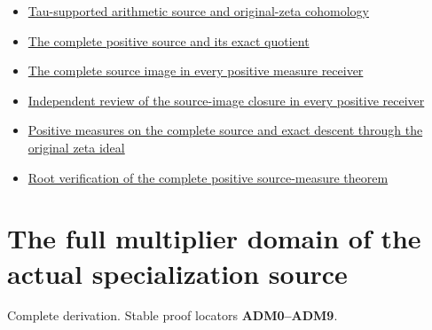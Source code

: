 \begin{itemize}
{  monodromy, complete clock observations, and the original zeta weights}
\item
  \href{https://github.com/KokunoYumeto/zeta-function-research-reader/blob/main/workbenches/splitzero-tandem/continuations/20260925-full-source-tensor-and-original-divisor/identity/README.md}{Tau-supported
  arithmetic source and original-zeta cohomology}
\item
  \href{https://github.com/KokunoYumeto/zeta-function-research-reader/blob/main/workbenches/splitzero-tandem/continuations/20260925-full-source-tensor-and-original-divisor/identity/SOURCE_MEASURE_ADDITION.md}{The
  complete positive source and its exact quotient}
\item
  \href{https://github.com/KokunoYumeto/zeta-function-research-reader/blob/main/workbenches/splitzero-tandem/continuations/20260925-full-source-tensor-and-original-divisor/identity/SOURCE_MEASURE_CLOSURE_AND_ORIGINAL_QUOTIENT.md}{The
  complete source image in every positive measure receiver}
\item
  \href{https://github.com/KokunoYumeto/zeta-function-research-reader/blob/main/workbenches/splitzero-tandem/continuations/20260925-full-source-tensor-and-original-divisor/identity/SOURCE_MEASURE_CLOSURE_INDEPENDENT_REVIEW.md}{Independent
  review of the source-image closure in every positive receiver}
\item
  \href{https://github.com/KokunoYumeto/zeta-function-research-reader/blob/main/workbenches/splitzero-tandem/continuations/20260925-full-source-tensor-and-original-divisor/identity/SOURCE_POSITIVE_MEASURES_AND_DESCENT.md}{Positive
  measures on the complete source and exact descent through the original
  zeta ideal}
\item
  \href{https://github.com/KokunoYumeto/zeta-function-research-reader/blob/main/workbenches/splitzero-tandem/continuations/20260925-full-source-tensor-and-original-divisor/identity/SOURCE_POSITIVE_MEASURES_ROOT_VERIFICATION.md}{Root
  verification of the complete positive source-measure theorem}
\end{itemize}

\chapter{The full multiplier domain of the actual specialization
source}\label{the-full-multiplier-domain-of-the-actual-specialization-source}

Complete derivation. Stable proof locators \textbf{ADM0--ADM9}.

